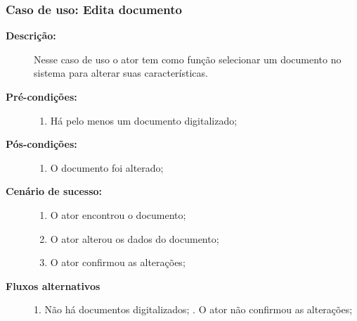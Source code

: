 \subsubsection{Caso de uso: Edita documento}
\begin{description}
    \item[{\bf Descrição:}] Nesse caso de uso o ator tem como função selecionar um documento no sistema para alterar suas características.
    \item[{\bf Pré-condições:}]
        \begin{enumerate}
            \item Há pelo menos um documento digitalizado;
        \end{enumerate}
    \item[{\bf Pós-condições:}] 
        \begin{enumerate}
            \item O documento foi alterado;
        \end{enumerate}
    
    \item[{\bf Cenário de sucesso:}]
        \begin{enumerate}
            \item O ator encontrou o documento;
            \item O ator alterou os dados do documento;
            \item O ator confirmou as alterações;
        \end{enumerate}

    \item[{\bf Fluxos alternativos}]
        1. Não há documentos digitalizados; . O ator não confirmou as alterações;
\end{description}



